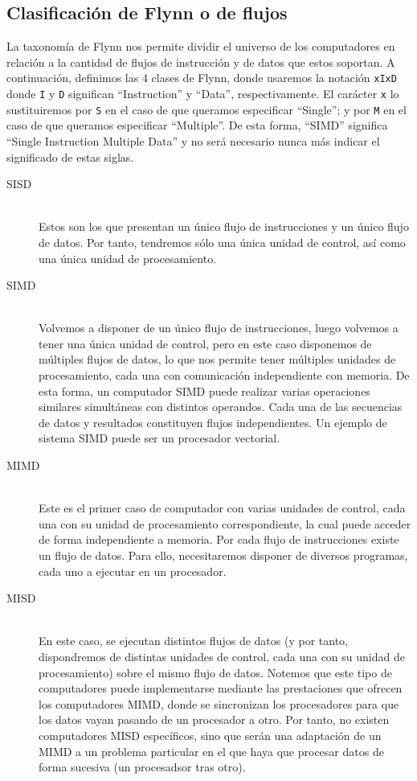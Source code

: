 \subsection{Clasificación de Flynn o de flujos}
La taxonomía de Flynn nos permite dividir el universo de los computadores en relación a la cantidad de flujos de instrucción y de datos que estos soportan. A continuación, definimos las 4 clases de Flynn, donde usaremos la notación \verb|xIxD| donde \verb|I| y \verb|D| significan ``Instruction'' y ``Data'', respectivamente. El carácter \verb|x| lo sustituiremos por \verb|S| en el caso de que queramos especificar ``Single''; y por \verb|M| en el caso de que queramos especificar ``Multiple''. De esta forma, ``SIMD'' significa ``Single Instruction Multiple Data'' y no será necesario nunca más indicar el significado de estas siglas.
\begin{description}
    \item [SISD]~\\
        Estos son los que presentan un único flujo de instrucciones y un único flujo de datos. Por tanto, tendremos sólo una única unidad de control, así como una única unidad de procesamiento. 
    \item [SIMD]~\\
        Volvemos a disponer de un único flujo de instrucciones, luego volvemos a tener una única unidad de control, pero en este caso disponemos de múltiples flujos de datos, lo que nos permite tener múltiples unidades de procesamiento, cada una con comunicación independiente con memoria. De esta forma, un computador SIMD puede realizar varias operaciones similares simultáneas con distintos operandos. Cada una de las secuencias de datos y resultados constituyen flujos independientes. Un ejemplo de sistema SIMD puede ser un procesador vectorial.
    \item [MIMD]~\\
        Este es el primer caso de computador con varias unidades de control, cada una con su unidad de procesamiento correspondiente, la cual puede acceder de forma independiente a memoria. Por cada flujo de instrucciones existe un flujo de datos. Para ello, necesitaremos disponer de diversos programas, cada uno a ejecutar en un procesador.
    \item [MISD]~\\
        En este caso, se ejecutan distintos flujos de datos (y por tanto, dispondremos de distintas unidades de control, cada una con su unidad de procesamiento) sobre el mismo flujo de datos. Notemos que este tipo de computadores puede implementarse mediante las prestaciones que ofrecen los computadores MIMD, donde se sincronizan los procesadores para que los datos vayan pasando de un procesador a otro. Por tanto, no existen computadores MISD específicos, sino que serán una adaptación de un MIMD a un problema particular en el que haya que procesar datos de forma sucesiva (un procesadsor tras otro).
\end{description}

